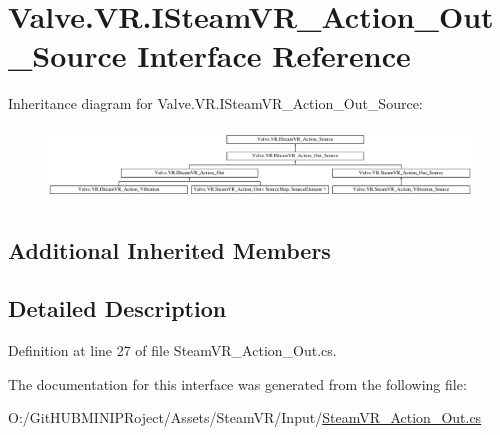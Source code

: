 \hypertarget{interface_valve_1_1_v_r_1_1_i_steam_v_r___action___out___source}{}\section{Valve.\+V\+R.\+I\+Steam\+V\+R\+\_\+\+Action\+\_\+\+Out\+\_\+\+Source Interface Reference}
\label{interface_valve_1_1_v_r_1_1_i_steam_v_r___action___out___source}
Inheritance diagram for Valve.\+V\+R.\+I\+Steam\+V\+R\+\_\+\+Action\+\_\+\+Out\+\_\+\+Source\+:\begin{figure}[H]
\begin{center}
\leavevmode
\includegraphics[height=1.949521cm]{interface_valve_1_1_v_r_1_1_i_steam_v_r___action___out___source}
\end{center}
\end{figure}
\subsection*{Additional Inherited Members}


\subsection{Detailed Description}


Definition at line 27 of file Steam\+V\+R\+\_\+\+Action\+\_\+\+Out.\+cs.



The documentation for this interface was generated from the following file\+:\begin{DoxyCompactItemize}
\item 
O\+:/\+Git\+H\+U\+B\+M\+I\+N\+I\+P\+Roject/\+Assets/\+Steam\+V\+R/\+Input/\mbox{\hyperlink{_steam_v_r___action___out_8cs}{Steam\+V\+R\+\_\+\+Action\+\_\+\+Out.\+cs}}\end{DoxyCompactItemize}
